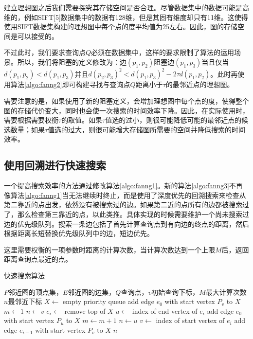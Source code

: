 建立理想图之后我们需要探究其存储空间是否合理。尽管数据集中的数据可能是高维的，例如SIFT[5]数据集中的数据有128维，但是其固有维度却只有11维。这使得使用SIFT数据集构建的理想图中每个点的度平均值为25左右。因此，图的存储空间是可以接受的。

不过此时，我们要求查询点$Q$必须在数据集中，这样的要求限制了算法的运用场景。所以，我们将阻塞的定义修改为：边$(p_1,p_2)$阻塞边$(p_1,p_3)$当且仅当$d(p_1,p_2)<d(p_1,p_3)$并且$d(p_2,p_3)^2<d(p_1,p_3)^2-2\tau d(p_1,p_2)$。此时再使用算法\ref{algo:fanng2}即可构建寻找与查询点$Q$距离小于$\tau$的最邻近点的理想图。

需要注意的是，如果使用了新的阻塞定义，会增加理想图中每个点的度，使得整个图的存储代价变大，同时也会使一次搜索的时间效率下降。因此，在实际使用时，需要根据需要权衡$\tau$的取值。如果$\tau$值选的过小，则很可能降低可能的最邻近点的候选数量；如果$\tau$值选的过大，则很可能增大存储图所需要的空间并降低搜索的时间效率。

\subsection{使用回溯进行快速搜索}

一个提高搜索效率的方法通过修改算法\ref{algo:fanng1}。新的算法\ref{algo:fanng3}不再像算法\ref{algo:fanng1}当无法继续时终止，而是使用了深度优先的回溯搜索来检查从第二靠近的点出发，依然没有被搜索过的边。如果第二近的点所有的边都被搜索过了，那么检查第三靠近的点，以此类推。具体实现的时候需要维护一个尚未搜索过边的优先级队列。搜索一条边包括了首先计算查询点到有向边的终点的距离，然后根据距离长短替换优先级队列中的边，短边优先。

这里需要权衡的一项参数时距离的计算次数，当计算次数达到一个上限$M$后，返回距离查询点最近的点。

\begin{algorithm}
	\caption{快速搜索算法}
	\label{algo:fanng3}
	\begin{algorithmic}[1] %
		\Require $P$邻近图的顶点集，$E$邻近图的边集，$Q$查询点，$v$初始查询下标，$M$最大计算次数 %
		\Ensure $n$最邻近下标 %
		\State $X\leftarrow$ empty priority queue
		\State add edge $e_0$ with start vertex $P_v$ to $X$
		\State $m\leftarrow 1$
		\State $n\leftarrow v$
		\State $e_i\leftarrow$ remove top of $X$
		\State $u\leftarrow$ index of end vertex of $e_i$
		\State add edge $e_0$ with start vertex $P_u$ to $X$
		\State $m\leftarrow m+1$
		\State $n\leftarrow u$
		\EndIf
		\EndIf
		\State $v\leftarrow$ index of start vertex of $e_i$
		\State add edge $e_{i+1}$ with start vertex $P_v$ to $X$
		\EndIf
		\EndWhile
		\Return $n$
	\end{algorithmic}
\end{algorithm}

